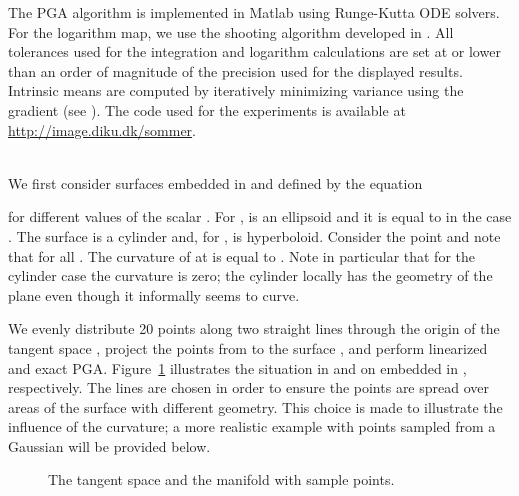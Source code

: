 \documentclass[final]{svjour3}
\begin{document}
The PGA algorithm is implemented in Matlab using 
Runge-Kutta ODE solvers. For the logarithm map, we use the shooting algorithm developed
in \cite{sommer_bicycle_2009}. All tolerances used for the integration and
logarithm calculations are set at or lower than an order of magnitude of the 
precision used for the displayed results. Intrinsic means are computed by
iteratively minimizing variance using the gradient  (see
\cite{karcher_riemannian_1977}). The code used for the experiments
is available at \url{http://image.diku.dk/sommer}.

\ \\
We first consider surfaces embedded in  and defined by the equation

for different values of the scalar . For ,  is an ellipsoid
and it is equal to  in the case . The surface  is a cylinder and, for
,  is hyperboloid. Consider the point  and note that  for all . 
The curvature of  at  is equal to . Note in particular that for the
cylinder case the curvature is zero; the cylinder locally has the geometry
of the plane  even though it informally seems to curve.

We evenly distribute 20 points along two straight lines
through the origin of the tangent space , project the points 
from  to the surface , and perform linearized and exact PGA. 
Figure~\ref{fig:low} illustrates the
situation in  and on  embedded in , respectively.
The lines are chosen in order to ensure the points are spread over areas of the
surface with different geometry. This choice is made to illustrate the influence
of the curvature;
a more realistic example with points sampled from a Gaussian will be provided
below.
\begin{figure}[h]
    \begin{center}
    \end{center}
    \caption{The tangent space  and the manifold  with sample
  points.}
    \label{fig:low}
\end{figure}
\end{document}
